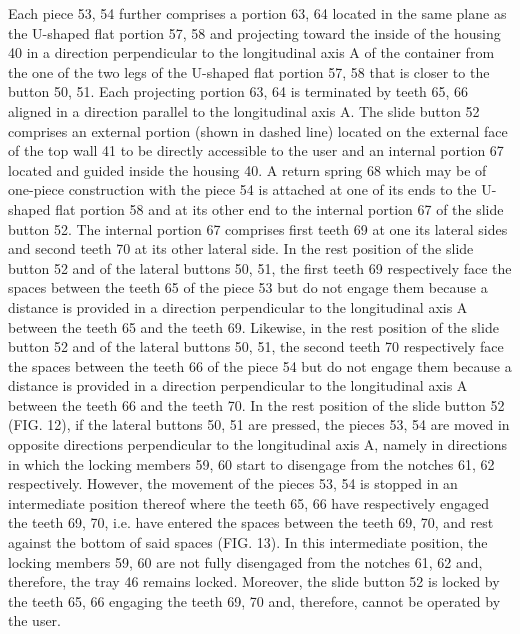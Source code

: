 \documentclass[11pt,a4paper]{article}
\begin{document}
Each piece 53, 54 further comprises a portion 63, 64 located in the same plane as the U-shaped flat portion 57, 58 and projecting toward the inside of the housing 40 in a direction perpendicular to the longitudinal axis A of the container from the one of the two legs of the U-shaped flat portion 57, 58 that is closer to the button 50, 51. Each projecting portion 63, 64 is terminated by teeth 65, 66 aligned in a direction parallel to the longitudinal axis A. The slide button 52 comprises an external portion (shown in dashed line) located on the external face of the top wall 41 to be directly accessible to the user and an internal portion 67 located and guided inside the housing 40. A return spring 68 which may be of one-piece construction with the piece 54 is attached at one of its ends to the U-shaped flat portion 58 and at its other end to the internal portion 67 of the slide button 52. The internal portion 67 comprises first teeth 69 at one its lateral sides and second teeth 70 at its other lateral side. In the rest position of the slide button 52 and of the lateral buttons 50, 51, the first teeth 69 respectively face the spaces between the teeth 65 of the piece 53 but do not engage them because a distance is provided in a direction perpendicular to the longitudinal axis A between the teeth 65 and the teeth 69. Likewise, in the rest position of the slide button 52 and of the lateral buttons 50, 51, the second teeth 70 respectively face the spaces between the teeth 66 of the piece 54 but do not engage them because a distance is provided in a direction perpendicular to the longitudinal axis A between the teeth 66 and the teeth 70. In the rest position of the slide button 52 (FIG. 12), if the lateral buttons 50, 51 are pressed, the pieces 53, 54 are moved in opposite directions perpendicular to the longitudinal axis A, namely in directions in which the locking members 59, 60 start to disengage from the notches 61, 62 respectively. However, the movement of the pieces 53, 54 is stopped in an intermediate position thereof where the teeth 65, 66 have respectively engaged the teeth 69, 70, i.e. have entered the spaces between the teeth 69, 70, and rest against the bottom of said spaces (FIG. 13). In this intermediate position, the locking members 59, 60 are not fully disengaged from the notches 61, 62 and, therefore, the tray 46 remains locked. Moreover, the slide button 52 is locked by the teeth 65, 66 engaging the teeth 69, 70 and, therefore, cannot be operated by the user.
\end{document}
